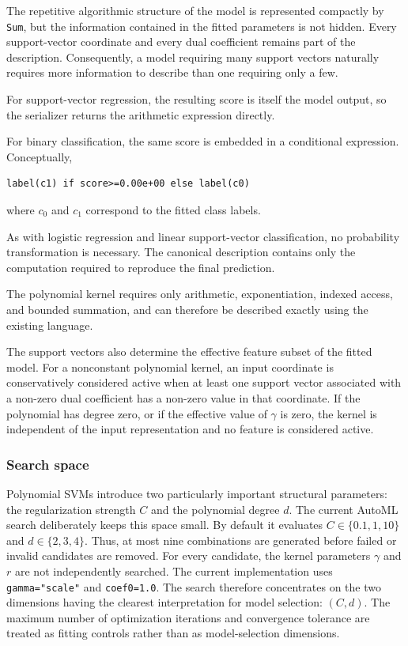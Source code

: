 The repetitive algorithmic structure of the model is represented compactly by \texttt{Sum}, but the information contained in the fitted parameters is not hidden. Every support-vector coordinate and every dual coefficient remains part of the description. Consequently, a model requiring many support vectors naturally requires more
information to describe than one requiring only a few.

For support-vector regression, the resulting score is itself the model output, so the serializer returns the arithmetic expression directly.

For binary classification, the same score is embedded in a conditional expression. Conceptually,

\begin{verbatim}
label(c1) if score>=0.00e+00 else label(c0)
\end{verbatim}

where $c_0$ and $c_1$ correspond to the fitted class labels.

As with logistic regression and linear support-vector classification, no probability transformation is necessary. The canonical description contains only the computation required to reproduce the final prediction.

The polynomial kernel requires only arithmetic, exponentiation, indexed access, and bounded summation, and can therefore be described exactly using the existing language.

The support vectors also determine the effective feature subset of the fitted model. For a nonconstant polynomial kernel, an input coordinate is conservatively considered active when at least one support vector associated with a non-zero dual coefficient has a non-zero value in that coordinate. If the polynomial has degree zero, or if the effective value of $\gamma$ is zero, the kernel is independent of the input representation and no feature is considered active.

\subsubsection{Search space}

Polynomial SVMs introduce two particularly important structural parameters: the regularization strength $C$ and the polynomial degree $d$. The current AutoML search deliberately keeps this space small. By default it
evaluates $C \in \{0.1,1,10\}$ and $d \in \{2,3,4\}$. Thus, at most nine combinations are generated before failed or invalid candidates are removed. For every candidate, the kernel parameters $\gamma$ and $r$ are not independently searched. The current implementation uses \texttt{gamma="scale"} and \texttt{coef0=1.0}. The search therefore concentrates on the two dimensions having the clearest interpretation for model selection: $(C,d)$. The maximum number of optimization iterations and convergence tolerance are treated as fitting controls rather than as model-selection dimensions.


